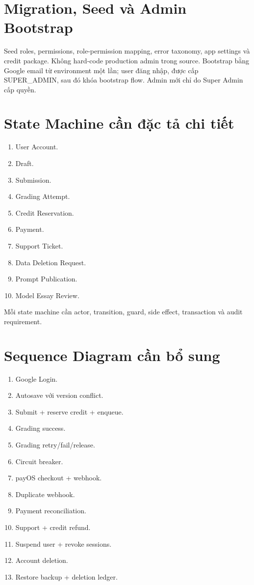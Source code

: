 \documentclass[11pt,a4paper]{article}
\begin{document}
\section{Migration, Seed và Admin Bootstrap}

Seed roles, permissions, role-permission mapping, error taxonomy, app settings và credit package. Không hard-code production admin trong source. Bootstrap bằng Google email từ environment một lần; user đăng nhập, được cấp SUPER\_ADMIN, sau đó khóa bootstrap flow. Admin mới chỉ do Super Admin cấp quyền.

\section{State Machine cần đặc tả chi tiết}

\begin{enumerate}
  \item User Account.
  \item Draft.
  \item Submission.
  \item Grading Attempt.
  \item Credit Reservation.
  \item Payment.
  \item Support Ticket.
  \item Data Deletion Request.
  \item Prompt Publication.
  \item Model Essay Review.
\end{enumerate}
Mỗi state machine cần actor, transition, guard, side effect, transaction và audit requirement.

\section{Sequence Diagram cần bổ sung}

\begin{enumerate}
  \item Google Login.
  \item Autosave với version conflict.
  \item Submit + reserve credit + enqueue.
  \item Grading success.
  \item Grading retry/fail/release.
  \item Circuit breaker.
  \item payOS checkout + webhook.
  \item Duplicate webhook.
  \item Payment reconciliation.
  \item Support + credit refund.
  \item Suspend user + revoke sessions.
  \item Account deletion.
  \item Restore backup + deletion ledger.
\end{enumerate}
\end{document}
